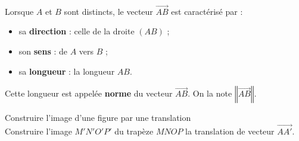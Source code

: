 \begin{Propriété}$ $\\
\vspace{-0.5cm}
\begin{minipage}[c]{0.7\linewidth}
Lorsque $A$ et $B$ sont distincts, le vecteur $\overrightarrow{AB}$ est caractérisé par : 
\begin{itemize}[label=\textcolor{Couleur2}{$\bullet$}]
\item sa {\bf{direction}} : celle de la droite $(AB)$ ;
\item son {\bf{sens}} : de $A$ vers $B$ ; 
\item sa {\bf{longueur}} : la longueur $AB$.
\end{itemize}

Cette longueur est appelée {\bf{norme}} du vecteur $\overrightarrow{AB}$. On la note $\left\Vert\overrightarrow{AB}\right\Vert$.
\end{minipage} \hfill
\begin{minipage}[c]{0.2\linewidth}
\end{minipage}


\end{Propriété}

\vspace{0.5cm}

\begin{Méthode}Construire l'image d'une figure par une translation\\
Construire l'image $M'N'O'P'$ du trapèze $MNOP$ la translation de vecteur $\overrightarrow{AA'}$.

\begin{center}
\end{center}

\end{Méthode}

